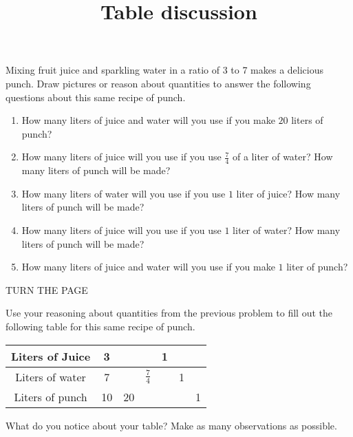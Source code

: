 \documentclass[nooutcomes,noauthor,handout]{ximera}
\title{Table discussion}
\begin{document}
\begin{abstract} 
\end{abstract}
\maketitle

\begin{problem}
Mixing fruit juice and sparkling water in a ratio of 3 to 7 makes a delicious punch.  Draw pictures or reason about quantities to answer the following questions about this same recipe of punch.
\begin{enumerate}
    \item How many liters of juice and water will you use if you make $20$ liters of punch?
    \item How many liters of juice will you use if you use $\frac{7}{4}$ of a liter of water?  How many liters of punch will be made?
    \item How many liters of water will you use if you use $1$ liter of juice?  How many liters of punch will be made?
    \item How many liters of juice will you use if you use $1$ liter of water?  How many liters of punch will be made?
    \item How many liters of juice and water will you use if you make $1$ liter of punch?
\end{enumerate}
\end{problem}
\vfill
TURN THE PAGE \newpage
\begin{problem} 
Use your reasoning about quantities from the previous problem to fill out the following table for this same recipe of punch.  


\setlength{\tabcolsep}{23pt}
\renewcommand\arraystretch{3}
\begin{tabular}{|c|c|c|c|c|c|c|} \hline
Liters of Juice & 3  & & & 1 & & \\  \hline
Liters of water & 7  & & $\frac{7}{4}$  & & 1  & \\  \hline
Liters of punch & 10 & 20  & & & & 1  \\  \hline
\end{tabular}


What do you notice about your table?  Make as many observations as possible.
\end{problem}
\end{document}
